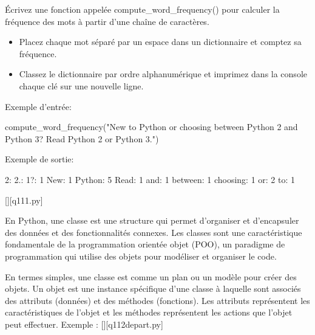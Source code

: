 		\question
		Écrivez une fonction appelée compute\_word\_frequency() pour calculer la fréquence des mots à partir d'une chaîne de caractères.
		
		  \begin{itemize}
		  \item Placez chaque mot séparé par un espace dans un dictionnaire et comptez sa fréquence.
		  \item Classez le dictionnaire par ordre alphanumérique et imprimez dans la console chaque clé sur une nouvelle ligne.
		  \end{itemize}
		
		Exemple d'entrée:
		
		compute\_word\_frequency("New to Python or choosing between Python 2 and Python 3? Read Python 2 or Python 3.")
		
		Exemple de sortie:
		
		2: 2.: 1?: 1\newline
		New: 1\newline
		Python: 5\newline
		Read: 1\newline
		and: 1\newline
		between: 1\newline
		choosing: 1\newline
		or: 2\newline
		to: 1
		\par
		\renewcommand{\nomfichier}{q111.py}
		\begin{solution}
		    \pythonfile{\chemincode \nomfichier}[][\nomfichier]
		\end{solution}
        
		\question
		En Python, une classe est une structure qui permet d'organiser et d'encapsuler des données et des fonctionnalités connexes. Les classes sont une caractéristique fondamentale de la programmation orientée objet (POO), un paradigme de programmation qui utilise des objets pour modéliser et organiser le code.
		
		En termes simples, une classe est comme un plan ou un modèle pour créer des objets. Un objet est une instance spécifique d'une classe à laquelle sont associés des attributs (données) et des méthodes (fonctions). Les attributs représentent les caractéristiques de l'objet et les méthodes représentent les actions que l'objet peut effectuer.
		Exemple :
		\renewcommand{\nomfichier}{q112depart.py}
		\pythonfile{\chemincode \nomfichier}[][\nomfichier]
		
